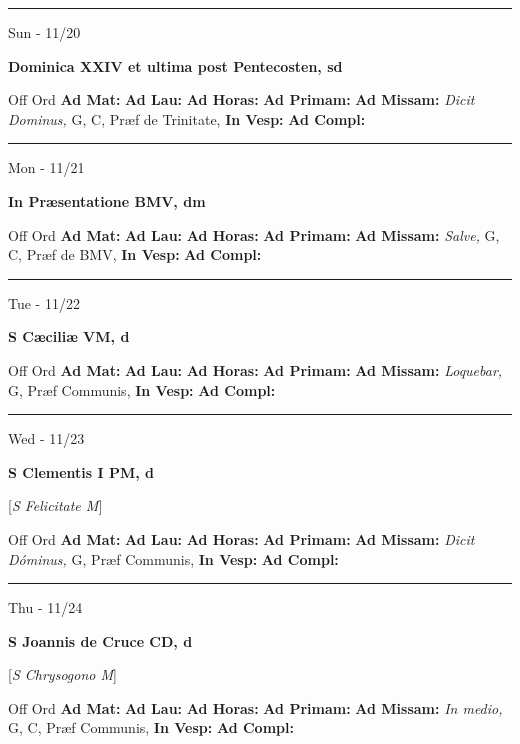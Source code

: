 \documentclass[letterpaper, 10pt]{article}
\begin{document}
\hrule
\begin{center}
Sun - 11/20
\end{center}\textbf{ \large Dominica XXIV et ultima post Pentecosten, \textnormal{\normalsize sd}}
\begin{justify}
Off Ord
\textbf{Ad Mat: }
\textbf{Ad Lau: }
\textbf{Ad Horas: }
\textbf{Ad Primam: }
\textbf{Ad Missam:} \textit{Dicit Dominus, } G, C, Præf de Trinitate, 
\textbf{In Vesp: }
\textbf{Ad Compl: }\end{justify}



\hrule
\begin{center}
Mon - 11/21
\end{center}\textbf{ \large In Præsentatione BMV, \textnormal{\normalsize dm}}
\begin{justify}
Off Ord
\textbf{Ad Mat: }
\textbf{Ad Lau: }
\textbf{Ad Horas: }
\textbf{Ad Primam: }
\textbf{Ad Missam:} \textit{Salve, } G, C, Præf de BMV, 
\textbf{In Vesp: }
\textbf{Ad Compl: }\end{justify}



\hrule
\begin{center}
Tue - 11/22
\end{center}\textbf{ \large S Cæciliæ VM, \textnormal{\normalsize d}}
\begin{justify}
Off Ord
\textbf{Ad Mat: }
\textbf{Ad Lau: }
\textbf{Ad Horas: }
\textbf{Ad Primam: }
\textbf{Ad Missam:} \textit{Loquebar, } G, Præf Communis, 
\textbf{In Vesp: }
\textbf{Ad Compl: }\end{justify}



\hrule
\begin{center}
Wed - 11/23
\end{center}\textbf{ \large S Clementis I PM, \textnormal{\normalsize d}}

[\textit{S Felicitate M}]
\begin{justify}
Off Ord
\textbf{Ad Mat: }
\textbf{Ad Lau: }
\textbf{Ad Horas: }
\textbf{Ad Primam: }
\textbf{Ad Missam:} \textit{Dicit Dóminus, } G, Præf Communis, 
\textbf{In Vesp: }
\textbf{Ad Compl: }\end{justify}



\hrule
\begin{center}
Thu - 11/24
\end{center}\textbf{ \large S Joannis de Cruce CD, \textnormal{\normalsize d}}

[\textit{S Chrysogono M}]
\begin{justify}
Off Ord
\textbf{Ad Mat: }
\textbf{Ad Lau: }
\textbf{Ad Horas: }
\textbf{Ad Primam: }
\textbf{Ad Missam:} \textit{In medio, } G, C, Præf Communis, 
\textbf{In Vesp: }
\textbf{Ad Compl: }\end{justify}
\end{document}
